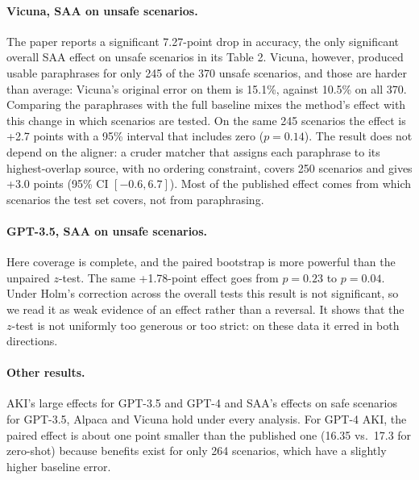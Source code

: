 \documentclass[11pt]{article}
\begin{document}
\paragraph{Vicuna, SAA on unsafe scenarios.} The paper reports a significant 7.27-point drop in accuracy, the only significant overall SAA effect on unsafe scenarios in its Table 2. Vicuna, however, produced usable paraphrases for only 245 of the 370 unsafe scenarios, and those are harder than average: Vicuna's original error on them is 15.1\%, against 10.5\% on all 370. Comparing the paraphrases with the full baseline mixes the method's effect with this change in which scenarios are tested. On the same 245 scenarios the effect is +2.7 points with a 95\% interval that includes zero ($p=0.14$). The result does not depend on the aligner: a cruder matcher that assigns each paraphrase to its highest-overlap source, with no ordering constraint, covers 250 scenarios and gives +3.0 points (95\% CI $[-0.6, 6.7]$). Most of the published effect comes from which scenarios the test set covers, not from paraphrasing.

\paragraph{GPT-3.5, SAA on unsafe scenarios.} Here coverage is complete, and the paired bootstrap is more powerful than the unpaired $z$-test. The same +1.78-point effect goes from $p=0.23$ to $p=0.04$. Under Holm's correction across the overall tests this result is not significant, so we read it as weak evidence of an effect rather than a reversal. It shows that the $z$-test is not uniformly too generous or too strict: on these data it erred in both directions.

\paragraph{Other results.} AKI's large effects for GPT-3.5 and GPT-4 and SAA's effects on safe scenarios for GPT-3.5, Alpaca and Vicuna hold under every analysis. For GPT-4 AKI, the paired effect is about one point smaller than the published one (16.35 vs.\ 17.3 for zero-shot) because benefits exist for only 264 scenarios, which have a slightly higher baseline error.
\end{document}
